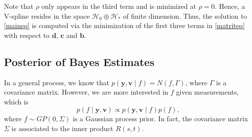 Note that $\rho$ only appears in the third term and is minimized at $\rho=0$. Hence, a V-spline resides in the space $\mathcal{H}_0\oplus \mathcal{H}_*$ of finite dimension. Thus, the solution to \eqref{maineq} is computed via the minimization of the first three terms in \eqref{matriteq} with respect to $\mathbf{d}$, $\mathbf{c}$ and $\mathbf{b}$.



\subsection{Posterior of Bayes Estimates}\label{sectionBayesEstimate}




In a general process, we know that $p(\mathbf{y},\mathbf{v}\mid f) = N(f,\Gamma)$, where $\Gamma$ is a covariance matrix. However, we are more interested in $f$ given measurements, which is  
\begin{equation}
p(f\mid \mathbf{y},\mathbf{v}) \propto p(\mathbf{y},\mathbf{v}\mid f)p(f),
\end{equation}
where $f\sim GP(0,\Sigma)$ is a Gaussian process prior. In fact, the covariance matrix $\Sigma$ is associated to the inner product $R(s,t)$. 

